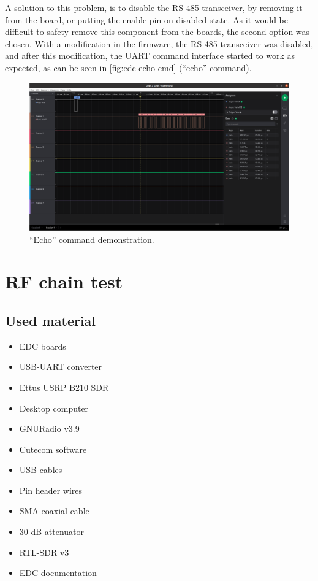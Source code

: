 A solution to this problem, is to disable the RS-485 transceiver, by removing it from the board, or putting the enable pin on disabled state. As it would be difficult to safety remove this component from the boards, the second option was chosen. With a modification in the firmware, the RS-485 transceiver was disabled, and after this modification, the UART command interface started to work as expected, as can be seen in \autoref{fig:edc-echo-cmd} (``echo'' command).

\begin{figure}[!ht]
    \begin{center}
        \includegraphics[width=\textwidth]{figures/edc_report/echo-cmd}
        \caption{``Echo'' command demonstration.}
        \label{fig:edc-echo-cmd}
    \end{center}
\end{figure}

\section{RF chain test}

\subsection{Used material}

\begin{itemize}
    \item EDC boards
    \item USB-UART converter
    \item Ettus USRP B210 SDR
    \item Desktop computer
    \item GNURadio v3.9
    \item Cutecom software
    \item USB cables
    \item Pin header wires
    \item SMA coaxial cable
    \item 30 dB attenuator
    \item RTL-SDR v3
    \item EDC documentation
\end{itemize}

